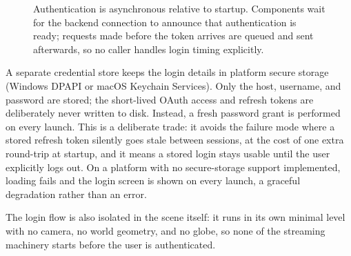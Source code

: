 \begin{figure}[t]
  \centering
  \caption[The authentication and startup sequence]{Authentication is asynchronous relative to startup. Components wait for the backend connection to announce that authentication is ready; requests made before the token arrives are queued and sent afterwards, so no caller handles login timing explicitly.}
  \label{fig:auth-sequence}
\end{figure}

A separate credential store keeps the login details in platform secure storage (Windows DPAPI or macOS Keychain Services). Only the host, username, and password are stored; the short-lived OAuth access and refresh tokens are deliberately never written to disk. Instead, a fresh password grant is performed on every launch. This is a deliberate trade: it avoids the failure mode where a stored refresh token silently goes stale between sessions, at the cost of one extra round-trip at startup, and it means a stored login stays usable until the user explicitly logs out. On a platform with no secure-storage support implemented, loading fails and the login screen is shown on every launch, a graceful degradation rather than an error.

The login flow is also isolated in the scene itself: it runs in its own minimal level with no camera, no world geometry, and no globe, so none of the streaming machinery starts before the user is authenticated.

